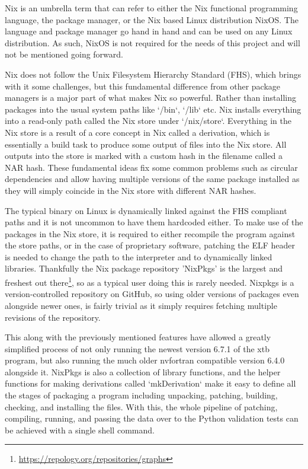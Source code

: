 Nix is an umbrella term that can refer to either the Nix functional programming language, the package manager, or the Nix based Linux distribution NixOS. The language and package manager go hand in hand and can be used on any Linux distribution. As such, NixOS is not required for the needs of this project and will not be mentioned going forward.

Nix does not follow the Unix Filesystem Hierarchy Standard (FHS), which brings with it some challenges, but this fundamental difference from other package managers is a major part of what makes Nix so powerful.
Rather than installing packages into the usual system paths like `/bin`, `/lib` etc. Nix installs everything into a read-only path called the Nix store under `/nix/store`.
Everything in the Nix store is a result of a core concept in Nix called a derivation, which is essentially a build task to produce some output of files into the Nix store.
All outputs into the store is marked with a custom hash in the filename called a NAR hash. These fundamental ideas fix some common problems such as circular dependencies and allow having multiple versions of the same package installed as they will simply coincide in the Nix store with different NAR hashes.

The typical binary on Linux is dynamically linked against the FHS compliant paths and it is not uncommon to have them hardcoded either. To make use of the packages in the Nix store, it is required to either recompile the program against the store paths, or in the case of proprietary software, patching the ELF header is needed to change the path to the interpreter and to dynamically linked libraries. Thankfully the Nix package repository 'NixPkgs' is the largest and freshest out there\footnote{\url{https://repology.org/repositories/graphs}}, so as a typical user doing this is rarely needed.
Nixpkgs is a version-controlled repository on GitHub, so using older versions of packages even alongside newer ones, is fairly trivial as it simply requires fetching multiple revisions of the repository.

This along with the previously mentioned features have allowed a greatly simplified process of not only running the newest version 6.7.1 of the xtb program, but also running the much older nvfortran compatible version 6.4.0 alongside it.
NixPkgs is also a collection of library functions, and the helper functions for making derivations called `mkDerivation` make it easy to define all the stages of packaging a program including unpacking, patching, building, checking, and installing the files.
With this, the whole pipeline of patching, compiling, running, and passing the data over to the Python validation tests can be achieved with a single shell command.

